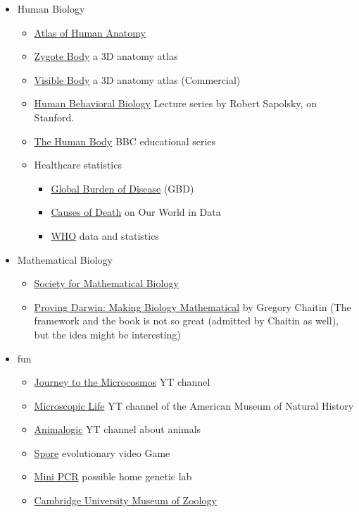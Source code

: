 \documentclass{article}
\begin{document}
\begin{itemize}
    \item Human Biology
    \begin{itemize}
        \item \href{https://www.goodreads.com/book/show/45843.Atlas_of_Human_Anatomy}{Atlas of Human Anatomy}
        \item \href{https://www.zygotebody.com/}{Zygote Body} a 3D anatomy atlas
        \item \href{https://www.visiblebody.com/en-us/}{Visible Body} a 3D anatomy atlas (Commercial)
        \item \href{https://www.youtube.com/playlist?list=PL848F2368C90DDC3D}{Human Behavioral Biology} Lecture series by Robert Sapolsky, on Stanford.
        \item \href{https://www.imdb.com/title/tt0200346/}{The Human Body} BBC educational series
        \item Healthcare statistics
        \begin{itemize}
            \item \href{https://vizhub.healthdata.org/gbd-compare/}{Global Burden of Disease} (GBD)
            \item \href{https://ourworldindata.org/causes-of-death}{Causes of Death} on Our World in Data
            \item \href{https://www.who.int/data/gho}{WHO} data and statistics
        \end{itemize}
    \end{itemize}
    
    \item Mathematical Biology
    \begin{itemize}
        \item \href{https://www.smb.org/}{Society for Mathematical Biology}
        \item \href{https://www.goodreads.com/book/show/13151411-proving-darwin}{Proving Darwin: Making Biology Mathematical} by Gregory Chaitin (The framework and the book is not so great (admitted by Chaitin as well), but the idea might be interesting)
    \end{itemize}
    
    \item fun
    \begin{itemize}
        \item \href{https://www.youtube.com/channel/UCBbnbBWJtwsf0jLGUwX5Q3g}{Journey to the Microcosmos} YT channel
        \item \href{https://www.youtube.com/playlist?list=PLrfcruGtplwH9gqNUy23btvvRuyhGw1sH}{Microscopic Life} YT channel of the American Museum of Natural History
        \item \href{https://www.youtube.com/channel/UCwg6_F2hDHYrqbNSGjmar4w}{Animalogic} YT channel about animals
        \item \href{https://www.spore.com/}{Spore} evolutionary video Game
        \item \href{https://www.minipcr.com/}{Mini PCR} possible home genetic lab
        \item \href{https://www.museum.zoo.cam.ac.uk/}{Cambridge University Museum of Zoology}
    \end{itemize}
    

\end{itemize}
\end{document}
